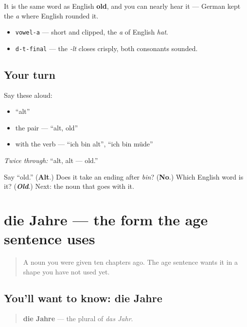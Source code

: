 It is the same word as English \textbf{old}, and you can nearly hear it — German kept the \emph{a} where English rounded it.

\begin{sounds}
\begin{itemize}
\raggedright
  \item \texttt{vowel-a} — short and clipped, the \emph{a} of English \emph{hat}.
  \item \texttt{d-t-final} — the \emph{-lt} closes crisply, both consonants sounded.
\end{itemize}
\end{sounds}

\subsection*{Your turn}
Say these aloud:

\begin{itemize}
\raggedright
  \item \textquotedblleft{}alt\textquotedblright{}
  \item the pair — \textquotedblleft{}alt, old\textquotedblright{}
  \item with the verb — \textquotedblleft{}ich bin alt\textquotedblright{}, \textquotedblleft{}ich bin müde\textquotedblright{}
\end{itemize}

\emph{Twice through:} \textquotedblleft{}alt, alt — old.\textquotedblright{}

\begin{tcolorbox}[breakable,colback=teal!4,colframe=teal!35!black,title={Before you move on}]
Say \textquotedblleft{}old.\textquotedblright{} (\textbf{Alt}.) Does it take an ending after \emph{bin}? (\textbf{No}.) Which English word is it? (\emph{\textbf{Old}}.) Next: the noun that goes with it.
\end{tcolorbox}
\section[die Jahre]{die Jahre — the form the age sentence uses}

\label{lesson:GE-C14-jahr}



\begin{quote}
A noun you were given ten chapters ago. The age sentence wants it in a shape you have not used yet.
\end{quote}

\subsection*{You'll want to know: die Jahre}
\begin{quote}
\textbf{die Jahre} — the plural of \emph{das Jahr}.
\end{quote}


